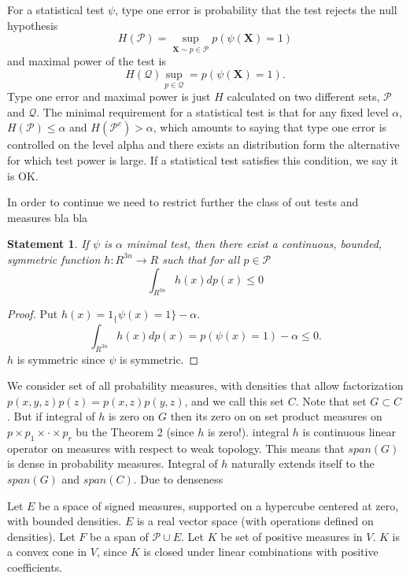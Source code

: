 \documentclass{article}
\newtheorem{statement}{Statement}
\begin{document}
For a statistical test $\psi$, type one error is probability that the test rejects the null hypothesis 
\[
 H(\mathcal{P}) =  \sup_{\mathbf{X} \sim p \in \mathcal{P} }   p( \psi(\mathbf X) =1 )
\]
and maximal power of the test is 
\[
H(\mathcal{Q}) \sup_{p \in \mathcal{Q} }  = p( \psi(\mathbf X) =1 ).
\]
Type one error and maximal power is just $H$  calculated on two different sets,  $\mathcal{P}$ and $\mathcal{Q}$. The minimal requirement for a statistical test is that for any fixed level $\alpha$, $H(\mathcal{P}) \leq \alpha$ and $H(\mathcal{P}^c) > \alpha$, which amounts to saying that type one error is controlled on the level alpha and there exists an distribution form the alternative for which test power is large. If a statistical test satisfies this condition, we say it is OK. 
 
In order to continue we need to restrict further the class of out tests and measures bla bla 

\begin{statement}
If $\psi$ is $\alpha$ minimal test, then there exist a continuous, bounded, symmetric function $h: R^{3n} \to R$ such that for all $p \in \mathcal{P}$ 
\[
 \int_{R^{3n}} h(x) dp(x)  \leq 0
\]
\end{statement}

\begin{proof}
 Put $h(x) = 1_\{ \psi(x) =1 \} - \alpha$. 
 \[
  \int_{R^{3n}} h(x) dp(x) = p( \psi(x) =1) - \alpha \leq 0.
 \]
$h$ is symmetric since $\psi$ is symmetric. 
\end{proof}

We consider set of all probability measures, with densities that allow factorization $p(x,y,z)p(z) = p(x,z)p(y,z)$, and we call this set $C$. Note that set $G \subset C$. But if integral of $h$ is zero on $G$ then its zero on on set product measures on $p \times p_1 \times \cdot \times p_r$ bu the Theorem 2 (since $h$ is zero!).  integral $h$ is continuous linear operator on measures with respect to weak topology. This means that $span(G)$ is dense in probability measures. Integral of $h$ naturally extends itself to the $span(G)$ and $span(C)$. Due to denseness  

Let $E$ be a space of signed measures, supported on a hypercube centered at zero, with bounded densities. $E$ is a real vector space (with operations defined on densities). Let $F$ be a span of $\mathcal P \cup E$. Let $K$ be set of positive measures in $V$. $K$ is a convex cone in $V$, since $K$ is closed under linear combinations with positive coefficients.
\end{document}
